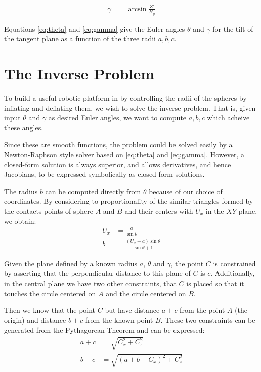 \documentclass{article}
\begin{document}
\begin{align}
  \gamma &= \arcsin{\frac{Z'}{H_y}} \label{eq:gamma}
\end{align}

Equations \ref{eq:theta} and \ref{eq:gamma} give the Euler angles
$\theta$ and $\gamma$
for the tilt of the
tangent plane as a function of the three radii $a,b,c$.


\section{The Inverse Problem}

To build a useful robotic platform in by controlling the radii of the
spheres by inflating and deflating them, we wish to solve the inverse
problem. That is, given input $\theta$ and $\gamma$ as desired Euler
angles, we want to compute $a,b,c$ which acheive these angles.

Since these are smooth functions, the problem could be solved
easily by a Newton-Raphson style solver based on \ref{eq:theta} and \ref{eq:gamma}.
However, a closed-form solution is always superior, and allows derivatives,
and hence Jacobians, to be expressed symbolically as closed-form solutions.

The radius $b$ can be computed directly from $\theta$
because of our choice of coordinates.
By considering to proportionality of the similar triangles formed
by the contacts points of sphere $A$ and $B$ and their centers with $U_x$ in the $XY$ plane,
we obtain:
\begin{align}
  U_x &= \frac{a}{\sin{\theta}} \\
  b &= \frac{(U_x - a)\sin{\theta}}{\sin{\theta}+1}
\end{align}

\newcommand{\abs}[1]{ \left\lvert#1\right\rvert}

Given the plane defined by a known radius $a$, $\theta$ and $\gamma$,
the point $C$ is constrained by asserting that the perpendicular
distance to this plane of $C$ is $c$.
Additionally, in the central plane we have two other constraints,
that $C$ is placed so that it touches the circle centered on $A$ and
the circle centered on $B$.

Then we know that the point $C$ but have distance $a+c$ from
the point $A$ (the origin) and distance $b+c$ from the known
point $B$. These two constraints can be generated from the Pythagorean Theorem and can be expressed:
\begin{align}
a + c &= \sqrt{C_x^2 + C_z ^2} \label{eq:a_constraint}\\
b + c &= \sqrt{(a+b-C_x)^2 + C_z^2} \label{eq:b_constraint}
\end{align}
\end{document}
